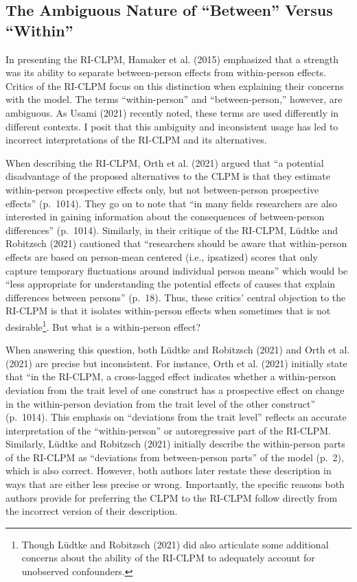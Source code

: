 \documentclass[
  english,
  man,floatsintext]{apa6}
\begin{document}
\hypertarget{the-ambiguous-nature-of-between-versus-within}{%
\subsection{The Ambiguous Nature of ``Between'' Versus ``Within''}\label{the-ambiguous-nature-of-between-versus-within}}

In presenting the RI-CLPM, Hamaker et al. (2015) emphasized that a strength was its ability to separate between-person effects from within-person effects. Critics of the RI-CLPM focus on this distinction when explaining their concerns with the model. The terms ``within-person'' and ``between-person,'' however, are ambiguous. As Usami (2021) recently noted, these terms are used differently in different contexts. I posit that this ambiguity and inconsistent usage has led to incorrect interpretations of the RI-CLPM and its alternatives.

When describing the RI-CLPM, Orth et al. (2021) argued that ``a potential disadvantage of the proposed alternatives to the CLPM is that they estimate within-person prospective effects only, but not between-person prospective effects'' (p.~1014). They go on to note that ``in many fields researchers are also interested in gaining information about the consequences of between-person differences'' (p.~1014). Similarly, in their critique of the RI-CLPM, Lüdtke and Robitzsch (2021) cautioned that ``researchers should be aware that within-person effects are based on person-mean centered (i.e., ipsatized) scores that only capture temporary fluctuations around individual person means'' which would be ``less appropriate for understanding the potential effects of causes that explain differences between persons'' (p.~18). Thus, these critics' central objection to the RI-CLPM is that it isolates within-person effects when sometimes that is not desirable\footnote{Though Lüdtke and Robitzsch (2021) did also articulate some additional concerns about the ability of the RI-CLPM to adequately account for unobserved confounders.}. But what is a within-person effect?

When answering this question, both Lüdtke and Robitzsch (2021) and Orth et al. (2021) are precise but inconsistent. For instance, Orth et al. (2021) initially state that ``in the RI-CLPM, a cross-lagged effect indicates whether a within-person deviation from the trait level of one construct has a prospective effect on change in the within-person deviation from the trait level of the other construct'' (p.~1014). This emphasis on ``deviations from the trait level'' reflects an accurate interpretation of the ``within-person'' or autoregressive part of the RI-CLPM. Similarly, Lüdtke and Robitzsch (2021) initially describe the within-person parts of the RI-CLPM as ``deviations from between-person parts'' of the model (p.~2), which is also correct. However, both authors later restate these description in ways that are either less precise or wrong. Importantly, the specific reasons both authors provide for preferring the CLPM to the RI-CLPM follow directly from the incorrect version of their description.
\end{document}
